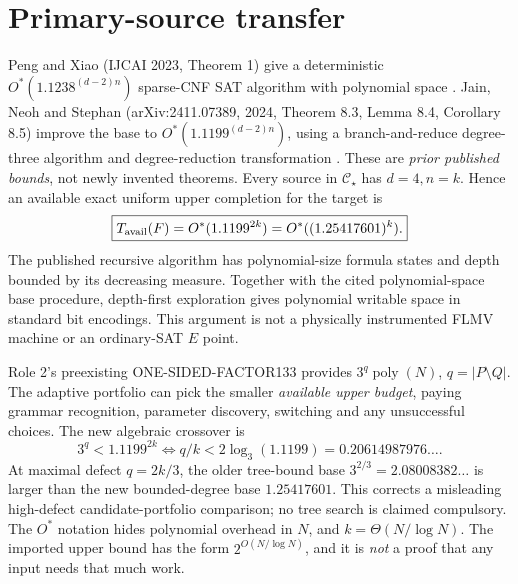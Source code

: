 \documentclass[11pt]{article}
\newcommand{\CS}{\mathcal C_\star}
\begin{document}
\section{Primary-source transfer}
Peng and Xiao (IJCAI 2023, Theorem 1) give a deterministic \(O^*(1.1238^{(d-2)n})\) sparse-CNF SAT algorithm with polynomial space \cite{peng}. Jain, Neoh and Stephan (arXiv:2411.07389, 2024, Theorem 8.3, Lemma 8.4, Corollary 8.5) improve the base to \(O^*(1.1199^{(d-2)n})\), using a branch-and-reduce degree-three algorithm and degree-reduction transformation \cite{jain}. These are \emph{prior published bounds}, not newly invented theorems. Every source in \(\CS\) has \(d=4,n=k\). Hence an available exact uniform upper completion for the target is
\[
\boxed{T_{\rm avail}(F)=O^*(1.1199^{2k})=O^*((1.25417601)^k).}
\]
The published recursive algorithm has polynomial-size formula states and depth bounded by its decreasing measure. Together with the cited polynomial-space base procedure, depth-first exploration gives polynomial writable space in standard bit encodings. This argument is not a physically instrumented FLMV machine or an ordinary-SAT \(E\) point.

Role 2's preexisting ONE-SIDED-FACTOR133 provides \(3^q\operatorname{poly}(N)\), \(q=\lvert P\setminus Q\rvert\). The adaptive portfolio can pick the smaller \emph{available upper budget}, paying grammar recognition, parameter discovery, switching and any unsuccessful choices. The new algebraic crossover is
\[
3^q<1.1199^{2k}\iff q/k<2\log_3(1.1199)=0.20614987976\ldots .
\]
At maximal defect \(q=2k/3\), the older tree-bound base \(3^{2/3}=2.08008382\ldots\) is larger than the new bounded-degree base \(1.25417601\). This corrects a misleading high-defect candidate-portfolio comparison; no tree search is claimed compulsory. The \(O^*\) notation hides polynomial overhead in \(N\), and \(k=\Theta(N/\log N)\). The imported upper bound has the form \(2^{O(N/\log N)}\), and it is \emph{not} a proof that any input needs that much work.
\end{document}
